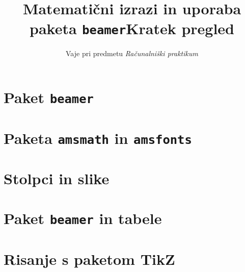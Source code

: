 \documentclass{beamer}
\title{Matematični izrazi in uporaba paketa \texttt{beamer}}
\subtitle{Vaje pri predmetu \emph{Računalniški praktikum}}
\institute{Fakulteta za matematiko in fiziko}
\date{}
\begin{document}
\begin{frame}
    \titlepage
\end{frame}

\begin{frame}
    \title{Kratek pregled}
    \tableofcontents%
\end{frame}

\section{Paket \texttt{beamer}}
    

\section{Paketa \texttt{amsmath} in \texttt{amsfonts}}
    

\section{Stolpci in slike}
    

\section{Paket \texttt{beamer} in tabele}
    

\section{Risanje s paketom TikZ}
    
\end{document}
